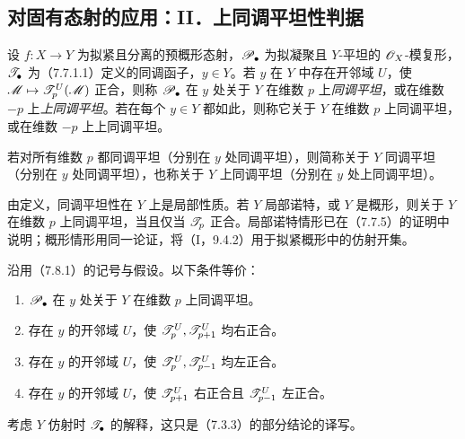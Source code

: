 \subsection{对固有态射的应用：II．上同调平坦性判据}

设 $f:X\to Y$ 为拟紧且分离的预概形态射，$\mathscr P_\bullet$ 为拟凝聚且 $Y$-平坦的 $\mathscr O_X$-模复形，$\mathscr T_\bullet$ 为（7.7.1.1）定义的同调函子，$y\in Y$。若 $y$ 在 $Y$ 中存在开邻域 $U$，使 $\mathscr M\mapsto\mathscr T_p^U(\mathscr M)$ 正合，则称 $\mathscr P_\bullet$ 在 $y$ 处关于 $Y$ 在维数 $p$ 上\emph{同调平坦}，或在维数 $-p$ 上\emph{上同调平坦}。若在每个 $y\in Y$ 都如此，则称它关于 $Y$ 在维数 $p$ 上同调平坦，或在维数 $-p$ 上上同调平坦。

若对所有维数 $p$ 都同调平坦（分别在 $y$ 处同调平坦），则简称关于 $Y$ 同调平坦（分别在 $y$ 处同调平坦），也称关于 $Y$ 上同调平坦（分别在 $y$ 处上同调平坦）。

由定义，同调平坦性在 $Y$ 上是局部性质。若 $Y$ 局部诺特，或 $Y$ 是概形，则关于 $Y$ 在维数 $p$ 上同调平坦，当且仅当 $\mathscr T_p$ 正合。局部诺特情形已在（7.7.5）的证明中说明；概形情形用同一论证，将（I，9.4.2）用于拟紧概形中的仿射开集。

沿用（7.8.1）的记号与假设。以下条件等价：
\begin{enumerate}[label=\alph*)]
\item $\mathscr P_\bullet$ 在 $y$ 处关于 $Y$ 在维数 $p$ 上同调平坦。
\item 存在 $y$ 的开邻域 $U$，使 $\mathscr T_p^U,\mathscr T_{p+1}^U$ 均右正合。
\item 存在 $y$ 的开邻域 $U$，使 $\mathscr T_p^U,\mathscr T_{p-1}^U$ 均左正合。
\item 存在 $y$ 的开邻域 $U$，使 $\mathscr T_{p+1}^U$ 右正合且 $\mathscr T_{p-1}^U$ 左正合。
\end{enumerate}
考虑 $Y$ 仿射时 $\mathscr T_\bullet$ 的解释，这只是（7.3.3）的部分结论的译写。

